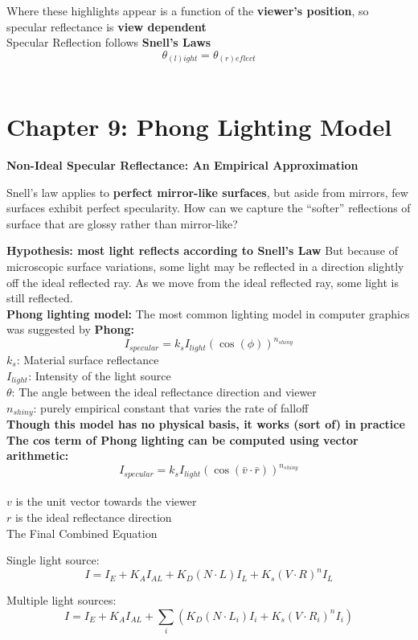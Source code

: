 \documentclass[]{report}
\begin{document}
Where these highlights appear is a function of the \textbf{viewer’s position},
so specular reflectance is \textbf{view dependent}\\
Specular Reflection follows \textbf{Snell’s Laws}
$$\theta_{(l)ight} = \theta_{(r)eflect}$$\\


\section*{Chapter 9: Phong Lighting Model}
\textbf{Non-Ideal Specular Reflectance: An Empirical Approximation}

Snell’s law applies to \textbf{perfect mirror-like surfaces}, but aside from
mirrors, few surfaces exhibit perfect specularity. How can we capture the “softer”
reflections of surface that are glossy
rather than mirror-like?

\textbf{Hypothesis: most light reflects according to Snell’s
	Law} But because of microscopic surface variations, some light
may be reflected in a direction slightly off the ideal reflected
ray. As we move from the ideal reflected ray, some light is
still reflected.\\
\textbf{Phong lighting model: }The most common lighting model in computer graphics was
suggested by \textbf{Phong:}
$$I_{specular} = k_{s}I_{light}(\cos(\phi))^{n_{shiny}}$$
$k_s$: Material surface reflectance\\
$I_{light}$: Intensity of the light source\\
$\theta$: The angle between the ideal
reflectance direction and viewer\\
$n_{shiny}$: purely
empirical constant that
varies the rate of falloff\\
\textbf{Though this model has no
	physical basis, it works
	(sort of) in practice}\\
\textbf{The cos term of Phong lighting can be computed
	using vector arithmetic:}
$$I_{specular} = k_{s}I_{light}(\cos(\bar{v} \cdot \bar{r}))^{n_{shiny}}$$\\
$v$ is the unit vector towards the viewer\\
$r$ is the ideal reflectance direction\\

The Final Combined Equation

Single light source:
$$I = I_E + K_{A}I_{AL} + K_D(N \cdot L)I_L + K_s(V \cdot R)^n I_L$$

Multiple light sources:
$$I = I_E + K_{A}I_{AL} + \sum_i (K_D(N \cdot L_i)I_i + K_s(V \cdot R_i)^n I_i)$$
\end{document}
